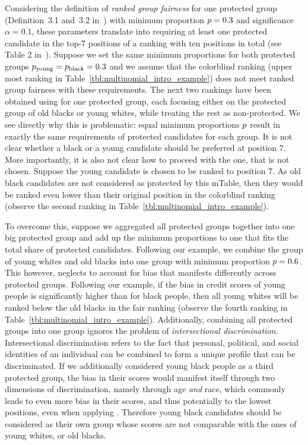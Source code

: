 Considering the definition of \textit{ranked group fairness} for one protected group (Definition~3.1 and~3.2 in~\cite{zehlike2017fair}) with minimum proportion $p=0.3$ and significance $\alpha=0.1$, these parameters translate into requiring at least one protected candidate in the top-7 positions of a ranking with ten positions in total (see Table 2 in~\cite{zehlike2017fair}).
%
Suppose we set the same minimum proportions for both protected groups $p_{\text{young}} = p_{\text{black}} = 0.3$ and we assume that the colorblind ranking (upper most ranking in Table~\ref{tbl:multinomial_intro_example}) does not meet ranked group fairness with these requirements.
%
The next two rankings have been obtained using \algoFAIR for one protected group, each focusing either on the protected group of old blacks or young whites, while treating the rest as non-protected.
%
We see directly why this is problematic: equal minimum proportions $p$ result in exactly the same requirements of protected candidates for each group. 
%
It is not clear whether a black or a young candidate should be preferred at position 7.
%
More importantly, it is also not clear how to proceed with the one, that is not chosen. 
%
Suppose the young candidate is chosen to be ranked to position 7. 
%
As old black candidates are not considered as protected by this mTable, then they would be ranked even lower than their original position in the colorblind ranking (observe the second ranking in Table~\ref{tbl:multinomial_intro_example}).

To overcome this, suppose we aggregated all protected groups together into one big protected group and add up the minimum proportions to one that fits the total share of protected candidates. 
%
Following our example, we combine the group of young whites and old blacks into one group with minimum proportion $p=0.6$.
%
This however, neglects to account for bias that manifests differently across protected groups.
%
Following our example, if the bias in credit scores of young people is significantly higher than for black people, then all young whites will be ranked below the old blacks in the fair ranking (observe the fourth ranking in Table~\ref{tbl:multinomial_intro_example}).
%
Additionally, combining all protected groups into one group ignores the problem of \emph{intersectional discrimination}.
%
Intersectional discrimination refers to the fact that personal, political, and social identities of an individual can be combined to form a unique profile that can be discriminated.
%
If we additionally considered young black people as a third protected group, the bias in their scores would manifest itself through two dimensions of discrimination, namely through age \emph{and} race, which commonly leads to even more bias in their scores, and thus potentially to the lowest positions, even when applying \algoFAIR.
%
Therefore young black candidates should be considered as their own group whose scores are not comparable with the ones of young whites, or old blacks.

